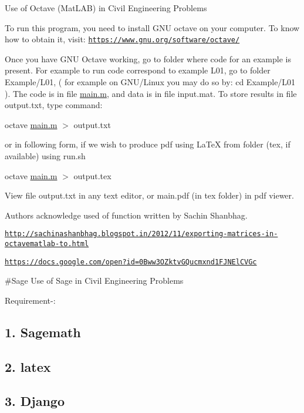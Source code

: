 Use of Octave (Mat\+L\+A\+B) in Civil Engineering Problems

To run this program, you need to install {\ttfamily G\+N\+U octave} on your computer. To know how to obtain it, visit\+: \href{https://www.gnu.org/software/octave/}{\tt https\+://www.\+gnu.\+org/software/octave/}

Once you have G\+N\+U Octave working, go to folder where code for an example is present. For example to run code correspond to example L01, go to folder Example/\+L01, ( for example on G\+N\+U/\+Linux you may do so by\+: {\ttfamily cd Example/\+L01} ). The code is in file {\ttfamily \hyperlink{a00039_af6e3698b7f50fc004eb759d7c447fdb3}{main.\+m}}, and data is in file {\ttfamily input.\+mat}. To store results in file {\ttfamily output.\+txt}, type command\+:

{\ttfamily octave \hyperlink{a00039_af6e3698b7f50fc004eb759d7c447fdb3}{main.\+m} $>$ output.\+txt}

or in following form, if we wish to produce pdf using La\+Te\+X from folder (tex, if available) using run.\+sh

{\ttfamily octave \hyperlink{a00039_af6e3698b7f50fc004eb759d7c447fdb3}{main.\+m} $>$ output.\+tex}

View file output.\+txt in any text editor, or main.\+pdf (in tex folder) in pdf viewer.

Authors acknowledge used of function written by Sachin Shanbhag.

\href{http://sachinashanbhag.blogspot.in/2012/11/exporting-matrices-in-octavematlab-to.html}{\tt http\+://sachinashanbhag.\+blogspot.\+in/2012/11/exporting-\/matrices-\/in-\/octavematlab-\/to.\+html}

\href{https://docs.google.com/open?id=0Bww3OZktvGQucmxnd1FJNElCVGc}{\tt https\+://docs.\+google.\+com/open?id=0\+Bww3\+O\+Zktv\+G\+Qucmxnd1\+F\+J\+N\+El\+C\+V\+Gc}

\#\+Sage Use of Sage in Civil Engineering Problems

Requirement-\/\+:

\subsection*{1. Sagemath}

\subsection*{2. latex}

\subsection*{3. Django}